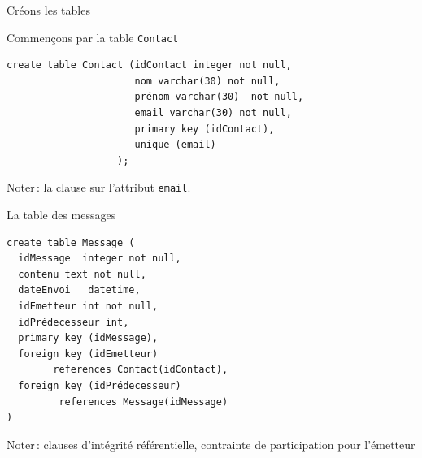 \begin{frame}[fragile]{Créons les tables}

Commençons par la table \texttt{Contact}

\vfill

\begin{verbatim}
create table Contact (idContact integer not null,
                      nom varchar(30) not null,
                      prénom varchar(30)  not null,
                      email varchar(30) not null,
                      primary key (idContact),
                      unique (email)
                   );  
\end{verbatim}

\vfill

\alert{Noter}\,: la clause 
sur l'attribut \texttt{email}. 

\end{frame}


\begin{frame}[fragile]{La table des messages}

\vfill

\begin{verbatim}
create table Message (
  idMessage  integer not null,
  contenu text not null,
  dateEnvoi   datetime,
  idEmetteur int not null,
  idPrédecesseur int,
  primary key (idMessage),
  foreign key (idEmetteur) 
        references Contact(idContact),
  foreign key (idPrédecesseur) 
         references Message(idMessage)
)
\end{verbatim}

\vfill

\alert{Noter}\,: clauses d'intégrité référentielle,
contrainte de participation pour l'émetteur

\end{frame}


